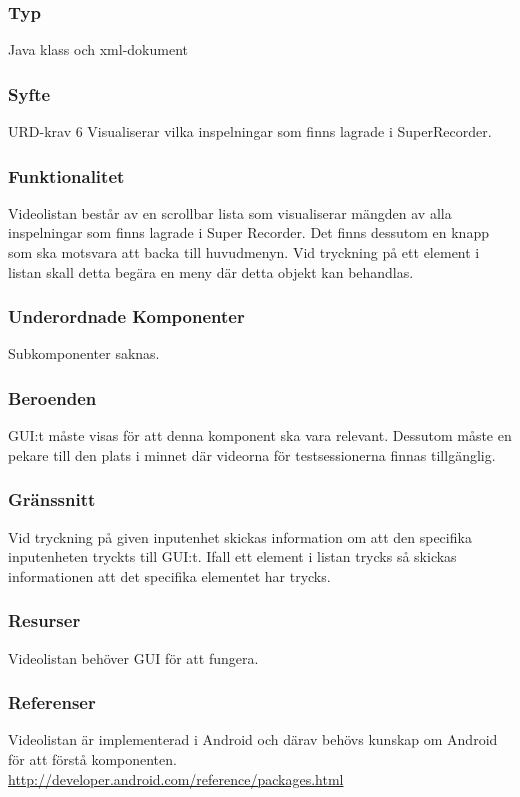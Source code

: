\subsubsection{Typ}
Java klass och xml-dokument

\subsubsection{Syfte}
URD-krav 6
Visualiserar vilka inspelningar som finns lagrade i SuperRecorder.

\subsubsection{Funktionalitet}
Videolistan består av en scrollbar lista som visualiserar mängden av alla inspelningar som finns lagrade i Super Recorder. Det finns dessutom en knapp som ska motsvara att backa till huvudmenyn. Vid tryckning på ett element i listan skall detta begära en meny där detta objekt kan behandlas.

\subsubsection{Underordnade Komponenter}
Subkomponenter saknas.

\subsubsection{Beroenden}
GUI:t måste visas för att denna komponent ska vara relevant. Dessutom måste en pekare till den plats i minnet där videorna för testsessionerna finnas tillgänglig.

\subsubsection{Gränssnitt}
Vid tryckning på given inputenhet skickas information om att den specifika inputenheten tryckts till GUI:t. Ifall ett element i listan trycks så skickas informationen att det specifika elementet har trycks.

\subsubsection{Resurser}
Videolistan behöver GUI för att fungera.

\subsubsection{Referenser}
Videolistan är implementerad i Android och därav behövs kunskap om Android för att förstå komponenten.
\url{http://developer.android.com/reference/packages.html}

